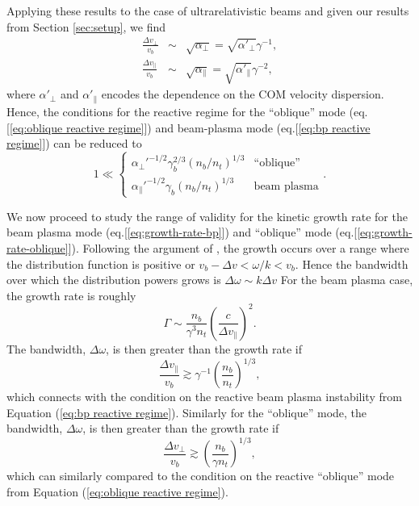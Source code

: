 \documentclass[usenatbib,iop,apj,numberedappendix]{aeb_emulateapj_2010}
\begin{document}
Applying these results to the case of ultrarelativistic beams and given our results from Section \ref{sec:setup}, we find
\begin{eqnarray}
\frac{\Delta v_{\perp}}{v_b} &\sim&  \sqrt{\alpha_{\perp}} = \sqrt{\alpha'_{\perp}} \gamma^{-1},\\
\frac{\Delta v_{\parallel}}{v_b} &\sim& \sqrt{\alpha_{\parallel}} = \sqrt{\alpha'_{\parallel}}\gamma^{-2},
\end{eqnarray}
where $\alpha'_{\perp}$ and $\alpha'_{\parallel}$ encodes the dependence on the COM velocity dispersion.  Hence, the conditions for the reactive regime for the ``oblique'' mode (eq.[\ref{eq:oblique reactive regime}]) and beam-plasma mode (eq.[\ref{eq:bp reactive regime}]) can be reduced to 
\begin{equation}\label{eq:generic reactive regime}
 \displaystyle
1 \ll \left\{
 \begin{array}{cl}
\alpha_{\perp}'^{-1/2}\gamma_b^{2/3}\left({n_b}/{n_t}\right)^{1/3} & \textrm{``oblique''} \\
\alpha_{\parallel}'^{-1/2}\gamma_b\left({n_b}/{n_t}\right)^{1/3} & \textrm{beam plasma} 
\end{array}
\right..
\end{equation}

We now proceed to study the range of validity for the kinetic growth rate for the beam plasma mode (eq.[\ref{eq:growth-rate-bp}]) and ``oblique'' mode (eq.[\ref{eq:growth-rate-oblique}]).  Following the argument of \cite{Boyd}, the growth occurs over a range where the distribution function is positive or $v_b - \Delta v < \omega/k < v_b$.  Hence the bandwidth over which the distribution powers grows is $\Delta \omega \sim k \Delta v$  For the beam plasma case, the growth rate is roughly
\begin{equation}
 \Gamma \sim \frac{n_b}{\gamma^3n_t} \left(\frac{c}{\Delta v_{\parallel}}\right)^{2}.
\end{equation}
The bandwidth, $\Delta \omega$, is then greater than the growth rate if 
\begin{equation}\label{eq:bp kinetic regime}
 \frac{\Delta v_{\parallel}}{v_b} \gtrsim \gamma^{-1}\left(\frac{n_b}{n_t}\right)^{1/3},
\end{equation}
which connects with the condition on the reactive beam plasma instability from Equation (\ref{eq:bp reactive regime}).
Similarly for the ``oblique'' mode, the bandwidth, $\Delta \omega$, is then greater than the growth rate if 
\begin{equation}\label{eq:oblique kinetic regime}
\frac{\Delta v_{\perp}}{v_b} \gtrsim \left(\frac{n_b}{\gamma n_t}\right)^{1/3},
\end{equation}
which can similarly compared to the condition on the reactive ``oblique'' mode from Equation (\ref{eq:oblique reactive regime}).
\end{document}
